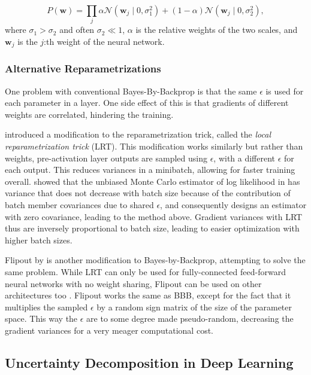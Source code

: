 	\begin{equation}
	\label{eq:gsm}
		P(\pmb{w}) = 
		\prod_{j}\alpha \mathcal{N}(\pmb{w}_j \mid 0,\sigma_1^2) + (1-\alpha)\mathcal{N}(\pmb{w}_j \mid 0,\sigma_2^2),
	\end{equation}  
	where $\sigma_1 > \sigma_2$ and often $\sigma_2 \ll 1$, $\alpha$ is the relative weights of the two scales, and $\pmb{w}_j$ is the $j$:th weight of the neural network. 
	
	\subsubsection*{Alternative Reparametrizations}

	One problem with conventional Bayes-By-Backprop is that the same $\epsilon$ is used for each parameter in a layer. One side effect of this is that gradients of different weights are correlated, hindering the training. 
	
	\citet{kingma_variational_2015} introduced a modification to the reparametrization trick, called the \textit{local reparametrization trick} (LRT). This modification works similarly but rather than weights, pre-activation layer outputs are sampled using $\epsilon$, with a different $\epsilon$ for each output. This reduces variances in a minibatch, allowing for faster training overall. \citet{kingma_variational_2015} showed that the unbiased Monte Carlo estimator of log likelihood in \citet{blundell_weight_2015} has variance that does not decrease with batch size because of the contribution of batch member covariances due to shared $\epsilon$, and consequently designs an estimator with zero covariance, leading to the method above. Gradient variances with LRT thus are inversely proportional to batch size, leading to easier optimization with higher batch sizes. 

	Flipout by \citet{wen_flipout_2018} is another modification to Bayes-by-Backprop, attempting to solve the same problem. While LRT can only be used for fully-connected feed-forward neural networks with no weight sharing, Flipout can be used on other architectures too \cite{wen_flipout_2018}. Flipout works the same as BBB, except for the fact that it multiplies the sampled $\epsilon$ by a random sign matrix of the size of the parameter space. This way the $\epsilon$ are to some degree made pseudo-random, decreasing the gradient variances for a very meager computational cost.
	


\subsection{Uncertainty Decomposition in Deep Learning} 

